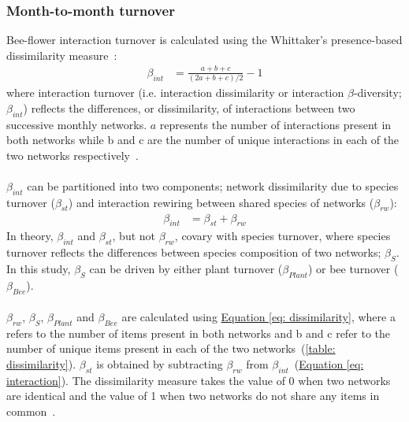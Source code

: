 \documentclass[11pt]{article}
\begin{document}
\subsubsection{Month-to-month turnover}
Bee-flower interaction turnover is calculated using the Whittaker's presence-based dissimilarity measure~\citep{Whittaker1960}: 
\begin{align}
	\beta_{int} & = \frac{a + b + c}{(2a + b + c)/2} - 1 
\label{eq: dissimilarity}
\end{align}
where interaction turnover (i.e. interaction dissimilarity or interaction $\beta$-diversity; $\beta_{int}$) reflects the differences, or dissimilarity, of interactions between two successive monthly networks. $a$ represents the number of interactions present in both networks while b and c are the number of unique interactions in each of the two networks respectively~\citep{Poisot2012}. \\
\\
$\beta_{int}$ can be partitioned into two components; network dissimilarity due to species turnover ($\beta_{st}$) and interaction rewiring between shared species of networks ($\beta_{rw}$):
\begin{align}
	\beta_{int} & = \beta_{st} + \beta_{rw} 
\label{eq: interaction}
\end{align}
In theory, $\beta_{int}$ and $\beta_{st}$, but not $\beta_{rw}$, covary with species turnover, where species turnover reflects the differences between species composition of two networks; $\beta_{S}$. In this study, $\beta_{S}$ can be driven by either plant turnover ($\beta_{Plant}$) or bee turnover ($\beta_{Bee}$). \\
\\
$\beta_{rw}$, $\beta_{S}$, $\beta_{Plant}$ and $\beta_{Bee}$ are calculated using \hyperref[eq: dissimilarity]{Equation \ref{eq: dissimilarity}}, where a refers to the number of items present in both networks and b and c refer to the number of unique items present in each of the two networks~(\autoref{table: dissimilarity}). $\beta_{st}$ is obtained by subtracting $\beta_{rw}$ from $\beta_{int}$~(\hyperref[eq: interaction]{Equation \ref{eq: interaction}}). The dissimilarity measure takes the value of 0 when two networks are identical and the value of 1 when two networks do not share any items in common~\citep{Poisot2012, CaraDonna2017}. \\
\end{document}
